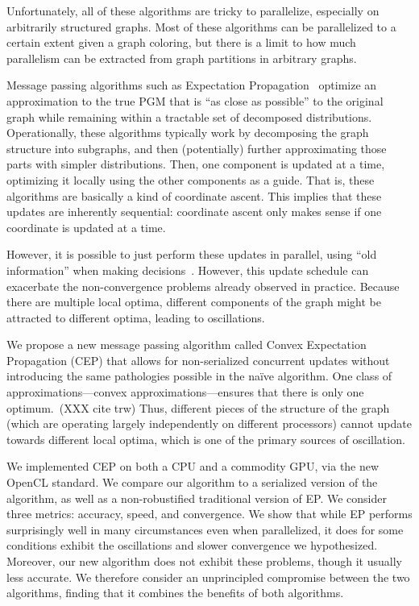 \documentclass[times, 10pt,twocolumn]{article}
\begin{document}
Unfortunately, all of these algorithms are tricky to parallelize,
especially on arbitrarily structured graphs. Most of these algorithms
can be parallelized to a certain extent given a graph coloring, but
there is a limit to how much parallelism can be extracted from graph
partitions in arbitrary graphs.

Message passing algorithms such as Expectation
Propagation~\cite{Minka01} optimize an approximation to the true
PGM that is ``as close as possible'' to the original graph while
remaining within a tractable set of decomposed distributions.
Operationally, these algorithms typically work by decomposing the
graph structure into subgraphs, and then (potentially) further
approximating those parts with simpler distributions. Then, one
component is updated at a time, optimizing it locally using the
other components as a guide. That is, these algorithms are basically
a kind of coordinate ascent. This implies that these updates are
inherently sequential: coordinate ascent only makes sense if one
coordinate is updated at a time.

However, it is possible to just perform these updates in parallel,
using ``old information'' when making decisions~\cite{CsekeHeskes2010}.
However, this update schedule can exacerbate the non-convergence
problems already observed in practice. Because there are multiple
local optima, different components of the graph might be attracted
to different optima, leading to oscillations.

We propose a new message passing algorithm called Convex Expectation
Propagation (CEP) that allows for non-serialized concurrent updates
without introducing the same pathologies possible in the na\"ive
algorithm.  One class of approximations---convex approximations---ensures
that there is only one optimum.~(XXX cite trw) Thus, different
pieces of the structure of the graph (which are operating largely
independently on different processors) cannot update towards different
local optima, which is one of the primary sources of oscillation.

We implemented CEP on both a CPU and a commodity GPU, via the new
OpenCL standard. We compare our algorithm to a serialized version
of the algorithm, as well as a non-robustified traditional version
of EP. We consider three metrics: accuracy, speed, and convergence.
We show that while EP performs surprisingly well in many circumstances
even when parallelized, it does for some conditions exhibit the
oscillations and slower convergence we hypothesized. Moreover, our
new algorithm does not exhibit these problems, though it usually
less accurate. We therefore consider an unprincipled compromise
between the two algorithms, finding that it combines the benefits of
both algorithms.
\end{document}
